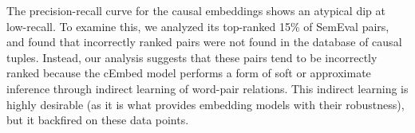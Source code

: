 




The precision-recall curve for the causal embeddings shows an atypical dip at low-recall.  To examine this, we analyzed its top-ranked 15\% of SemEval pairs, and found that incorrectly ranked pairs were not found in the database of causal tuples.  
Instead, our analysis suggests that these pairs tend to be incorrectly ranked because the cEmbed model performs a form of soft or approximate inference through indirect learning of word-pair relations.  
This indirect learning is highly desirable (as it is what provides embedding models with their robustness), but it backfired on these data points.  

